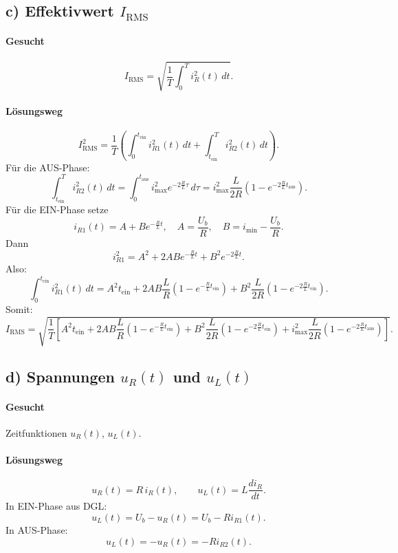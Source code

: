 \subsection*{c) Effektivwert $I_{\mathrm{RMS}}$}

\paragraph{Gesucht}
\[
I_{\mathrm{RMS}}=\sqrt{\frac{1}{T}\int_0^T i_R^2(t)\,dt}.
\]

\paragraph{Lösungsweg}
\[
I_{\mathrm{RMS}}^2=\frac{1}{T}\left(
\int_0^{t_\mathrm{ein}} i_{R1}^2(t)\,dt + \int_{t_\mathrm{ein}}^T i_{R2}^2(t)\,dt
\right).
\]
Für die AUS-Phase:
\[
\int_{t_\mathrm{ein}}^T i_{R2}^2(t)\,dt
=
\int_0^{t_\mathrm{aus}} i_\mathrm{max}^2 e^{-2\frac{R}{L}\tau}\,d\tau
=
i_\mathrm{max}^2\frac{L}{2R}\left(1-e^{-2\frac{R}{L}t_\mathrm{aus}}\right).
\]
Für die EIN-Phase setze
\[
i_{R1}(t)=A+B e^{-\frac{R}{L}t},
\quad A=\frac{U_b}{R},\quad B=i_\mathrm{min}-\frac{U_b}{R}.
\]
Dann
\[
i_{R1}^2=A^2+2ABe^{-\frac{R}{L}t}+B^2e^{-2\frac{R}{L}t}.
\]
Also:
\[
\int_0^{t_\mathrm{ein}} i_{R1}^2(t)\,dt
=
A^2 t_\mathrm{ein}
+2AB\frac{L}{R}\left(1-e^{-\frac{R}{L}t_\mathrm{ein}}\right)
+B^2\frac{L}{2R}\left(1-e^{-2\frac{R}{L}t_\mathrm{ein}}\right).
\]
Somit:
\[
\boxed{
I_{\mathrm{RMS}}=\sqrt{\frac{1}{T}\left[
A^2 t_\mathrm{ein}
+2AB\frac{L}{R}\left(1-e^{-\frac{R}{L}t_\mathrm{ein}}\right)
+B^2\frac{L}{2R}\left(1-e^{-2\frac{R}{L}t_\mathrm{ein}}\right)
+i_\mathrm{max}^2\frac{L}{2R}\left(1-e^{-2\frac{R}{L}t_\mathrm{aus}}\right)
\right]}.
}
\]


\subsection*{d) Spannungen $u_R(t)$ und $u_L(t)$}

\paragraph{Gesucht}
Zeitfunktionen $u_R(t)$, $u_L(t)$.

\paragraph{Lösungsweg}
\[
u_R(t)=R\,i_R(t),
\qquad
u_L(t)=L\frac{di_R}{dt}.
\]
In EIN-Phase aus DGL:
\[
u_L(t)=U_b-u_R(t)=U_b-Ri_{R1}(t).
\]
In AUS-Phase:
\[
u_L(t)=-u_R(t)=-R i_{R2}(t).
\]

